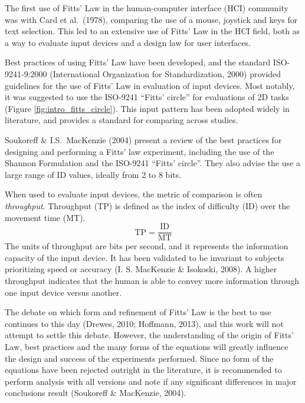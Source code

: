 The first use of Fitts' Law in the human-computer interface (HCI) community was with Card et al.\ (1978), comparing the use of a mouse, joystick and keys for text selection.
This led to an extensive use of Fitts' Law in the HCI field, both as a way to evaluate input devices and a design law for user interfaces.

Best practices of using Fitts' Law have been developed, and the standard ISO-9241-9:2000 (International Organization for Standardization, 2000) provided guidelines for the use of Fitts' Law in evaluation of input devices.
Most notably, it was suggested to use the ISO-9241 ``Fitts' circle'' for evaluations of 2D tasks (Figure \ref{fig:intro_fitts_circle}).
This input pattern has been adopted widely in literature, and provides a standard for comparing across studies.

Soukoreff \& I.S.\ MacKenzie (2004) present a review of the best practices for designing and performing a Fitts' law experiment, including the use of the Shannon Formulation and the ISO-9241 ``Fitts' circle''.
They also advise the use a large range of ID values, ideally from 2 to 8 bits.


When used to evaluate input devices, the metric of comparison is often \emph{throughput}.
Throughput (TP) is defined as the index of difficulty (ID) over the movement time (MT).
\begin{equation}
    \mathrm{TP} = \frac{\text{ID}}{\text{MT}}
\end{equation}
The units of throughput are bits per second, and it represents the information capacity of the input device.
It has been validated to be invariant to subjects prioritizing speed or accuracy (I.  S.  MacKenzie \& Isokoski, 2008).
A higher throughput indicates that the human is able to convey more information through one input device versus another.

The debate on which form and refinement of Fitts' Law is the best to use continues to this day (Drewes, 2010; Hoffmann, 2013), and this work will not attempt to settle this debate.
However, the understanding of the origin of Fitts' Law, best practices and the many forms of the equations will greatly influence the design and success of the experiments performed.
Since no form of the equations have been rejected outright in the literature, it is recommended to perform analysis with all versions and note if any significant differences in major conclusions result (Soukoreff \& MacKenzie, 2004).

